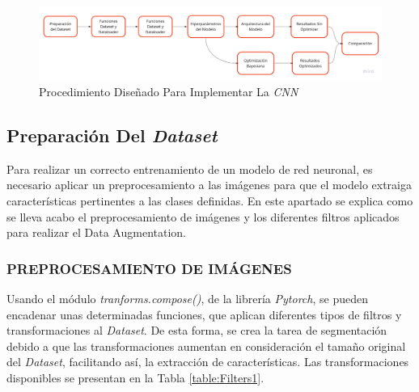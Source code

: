 \begin{figure}[ht]
	\centering
	\includegraphics[scale=0.15]{Figs/procedimiento.jpg}
	\caption{Procedimiento Diseñado Para Implementar La \textit{CNN}}
	\label{fig:procedimiento}
\end{figure}	


\newpage
\subsection{Preparación Del \textit{Dataset}}

Para realizar un correcto entrenamiento de un modelo de red neuronal, es necesario aplicar un preprocesamiento a las imágenes para que el modelo extraiga características pertinentes a las clases definidas. En este apartado se explica como se lleva acabo el preprocesamiento de imágenes y los diferentes filtros aplicados para realizar el Data Augmentation.

\subsubsection{PREPROCESAMIENTO DE IMÁGENES}

Usando el módulo \textit{tranforms.compose()}, de la librería \textit{Pytorch}, se pueden encadenar unas determinadas funciones, que aplican diferentes tipos de filtros y transformaciones al \textit{Dataset}. De esta forma, se crea la tarea de segmentación debido a que las transformaciones aumentan en consideración el tamaño original del \textit{Dataset}, facilitando así, la extracción de características. Las transformaciones disponibles se presentan en la Tabla \ref{table:Filters1}.

